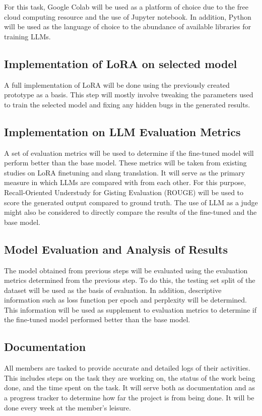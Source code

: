 For this task, Google Colab will be used as a platform of choice due to the free cloud computing resource and the use of Jupyter notebook.
In addition, Python will be used as the language of choice to the abundance of available libraries for training LLMs.

\subsection{Implementation of LoRA on selected model}
A full implementation of LoRA will be done using the previously created prototype as a basis.
This step will mostly involve tweaking the parameters used to train the selected model and fixing any hidden bugs in the generated results.

\subsection{Implementation on LLM Evaluation Metrics}
A set of evaluation metrics will be used to determine if the fine-tuned model will perform better than the base model.
These metrics will be taken from existing studies on LoRA finetuning and slang translation.
It will serve as the primary measure in which LLMs are compared with from each other.
For this purpose, Recall-Oriented Understudy for Gisting Evaluation (ROUGE) will be used to score the generated output compared to ground truth.
The use of LLM as a judge might also be considered to directly compare the results of the fine-tuned and the base model.

\subsection{Model Evaluation and Analysis of Results}
The model obtained from previous steps will be evaluated using the evaluation metrics determined from the previous step.
To do this, the testing set split of the dataset will be used as the basis of evaluation.
In addition, descriptive information such as loss function per epoch and perplexity will be determined.
This information will be used as supplement to evaluation metrics to determine if the fine-tuned model performed better than the base model.

\subsection{Documentation}
All members are tasked to provide accurate and detailed logs of their activities.
This includes steps on the task they are working on, the status of the work being done, and the time spent on the task.
It will serve both as documentation and as a progress tracker to determine how far the project is from being done.
It will be done every week at the member’s leisure.


